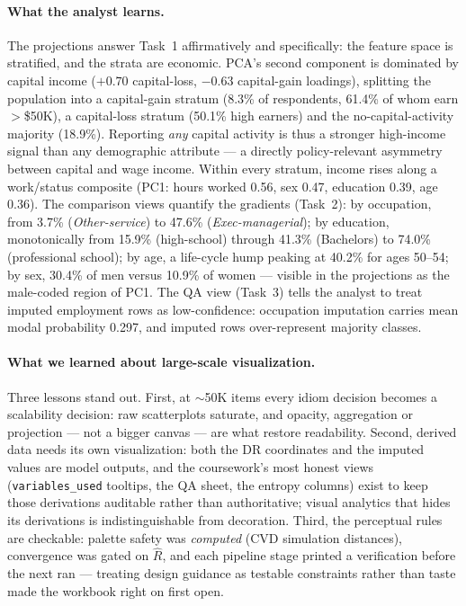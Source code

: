 \documentclass[11pt,a4paper]{article}
\begin{document}
\paragraph{What the analyst learns.}
The projections answer Task~1 affirmatively and specifically: the feature
space is stratified, and the strata are economic. PCA's second component is
dominated by capital income ($+0.70$ capital-loss, $-0.63$ capital-gain
loadings), splitting the population into a capital-gain stratum (8.3\% of
respondents, 61.4\% of whom earn $>$\$50K), a capital-loss stratum (50.1\%
high earners) and the no-capital-activity majority (18.9\%). Reporting
\emph{any} capital activity is thus a stronger high-income signal than any
demographic attribute --- a directly policy-relevant asymmetry between
capital and wage income. Within every stratum, income rises along a
work/status composite (PC1: hours worked 0.56, sex 0.47, education 0.39,
age 0.36). The comparison views quantify the gradients (Task~2): by
occupation, from 3.7\% (\textit{Other-service}) to 47.6\%
(\textit{Exec-managerial}); by education, monotonically from 15.9\%
(high-school) through 41.3\% (Bachelors) to 74.0\% (professional school);
by age, a life-cycle hump peaking at 40.2\% for ages 50--54; by sex, 30.4\%
of men versus 10.9\% of women --- visible in the projections as the
male-coded region of PC1. The QA view (Task~3) tells the analyst to treat
imputed employment rows as low-confidence: occupation imputation carries
mean modal probability 0.297, and imputed rows over-represent majority
classes.

\paragraph{What we learned about large-scale visualization.}
Three lessons stand out. First, at $\sim$50K items every idiom decision
becomes a scalability decision: raw scatterplots saturate, and opacity,
aggregation or projection --- not a bigger canvas --- are what restore
readability. Second, derived data needs its own visualization: both the
DR coordinates and the imputed values are model outputs, and the coursework's
most honest views (\texttt{variables\_used} tooltips, the QA sheet, the
entropy columns) exist to keep those derivations auditable rather than
authoritative; visual analytics that hides its derivations is
indistinguishable from decoration. Third, the perceptual rules are
checkable: palette safety was \emph{computed} (CVD simulation distances),
convergence was gated on $\hat{R}$, and each pipeline stage printed a
verification before the next ran --- treating design guidance as testable
constraints rather than taste made the workbook right on first open.
\end{document}
